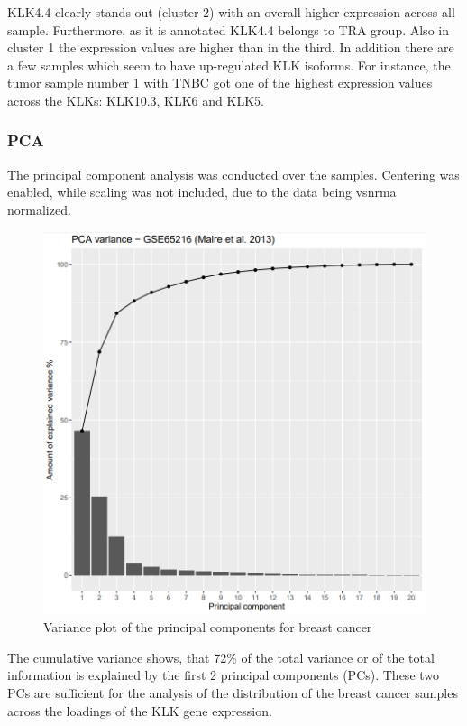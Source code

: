 \documentclass[
]{article}
\begin{document}
KLK4.4 clearly stands out (cluster 2) with an overall higher expression
across all sample. Furthermore, as it is annotated KLK4.4 belongs to TRA
group. Also in cluster 1 the expression values are higher than in the
third. In addition there are a few samples which seem to have
up-regulated KLK isoforms. For instance, the tumor sample number 1 with
TNBC got one of the highest expression values across the KLKs: KLK10.3,
KLK6 and KLK5.

\hypertarget{pca}{%
\subsubsection{PCA}\label{pca}}

The principal component analysis was conducted over the samples.
Centering was enabled, while scaling was not included, due to the data
being vsnrma normalized.\\

\begin{figure}

{\centering \includegraphics[width=0.5\linewidth]{images/PCA_variance_breast} 

}

\caption{Variance plot of the principal components for breast cancer}\label{fig:PCA variance - breast }
\end{figure}

The cumulative variance shows, that 72\% of the total variance or of the
total information is explained by the first 2 principal components
(PCs). These two PCs are sufficient for the analysis of the distribution
of the breast cancer samples across the loadings of the KLK gene
expression.\\
\end{document}
